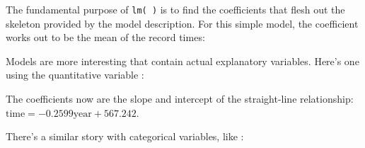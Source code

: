 The fundamental purpose of \texttt{lm( )} is to find the coefficients
that flesh out the skeleton provided by the model description.  For
this simple model, the coefficient works out to be the mean of the
record times:
\begin{knitrout}
\end{knitrout}


Models are more interesting that contain actual explanatory
variables.  Here's one using the quantitative variable :
\begin{knitrout}
\end{knitrout}

The coefficients now are the slope and intercept of the straight-line
relationship: $\mbox{time}  = -0.2599 \mbox{year} + 567.242$.

There's a similar story with categorical variables, like :
\begin{knitrout}
\end{knitrout}

